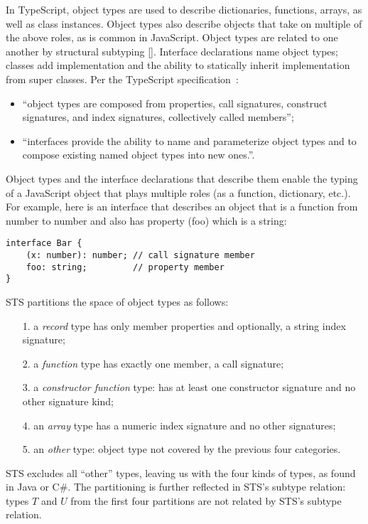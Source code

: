 In TypeScript, object types are used to describe dictionaries, functions, arrays, as well as class instances. Object 
types also describe objects that take on multiple of the above roles, as is common in JavaScript. Object types are
related to one another by structural subtyping [].  Interface declarations name object types; classes add implementation
and the ability to statically inherit implementation from super classes. Per the TypeScript specification~\cite{XYZ}:
\begin{itemize}
\item ``object types are composed from properties, call signatures, construct signatures, and index signatures, collectively called members'';
\item ``interfaces provide the ability to name and parameterize object types and to compose existing named object types into new ones.''.
\end{itemize} 
Object types and the interface declarations that describe them enable the typing of a JavaScript object that plays multiple roles
(as a function, dictionary, etc.). For example, here is an interface that describes an object that is a function from number to number
and also has property (foo) which is a string:
\begin{lstlisting}
interface Bar {
    (x: number): number; // call signature member
    foo: string;         // property member
}
\end{lstlisting}
STS partitions the space of object types as follows:
\begin{itemize}
\item[1.] a \emph{record} type has only member properties and optionally, a string index signature;
\item[2.] a \emph{function} type has exactly one member, a call signature;
\item[3.] a \emph{constructor function} type: has at least one constructor signature and no other signature kind;
\item[4.] an \emph{array} type has a numeric index signature and no other signatures;
\item[5.] an \emph{other} type: object type not covered by the previous four categories.
\end{itemize}
STS excludes all ``other'' types, leaving us with the four kinds of types, as found in Java or C\#.
The partitioning is further reflected in STS's subtype relation: 
types $T$ and $U$ from the first four partitions are not related by STS's subtype relation.

